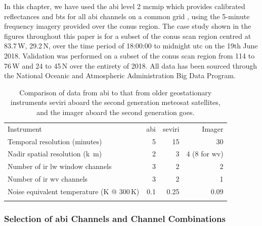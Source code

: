 In this chapter, we have used the \acrshort{abi} level 2 \acrshort{mcmip} which provides calibrated reflectances and \acrshort{bt}s for all \acrshort{abi} channels on a common grid \citep{schmit_chapter_2020}, using the 5-minute frequency imagery provided over the \acrshort{conus} region.
The case study shown in the figures throughout this paper is for a subset of the \acrshort{conus} scan region centred at 83.7\,\textdegree W, 29.2\,\textdegree N, over the time period of 18:00:00 to midnight \acrshort{utc} on the 19th June 2018.
Validation was performed on a subset of the \acrshort{conus} scan region from 114 to 76\,\textdegree W and 24 to 45\,\textdegree N over the entirety of 2018.
All data has been sourced through the National Oceanic and Atmospheric Administration Big Data Program.

\begin{table}[t]
\centering
\begin{tabular}{lrrr}
\tophline
Instrument                                              & \acrshort{abi}   & \acrshort{seviri}    & Imager \\
\middlehline
Temporal resolution (\unit{minutes})                    & 5     & 15        & 30 \\
Nadir spatial resolution (\unit{k m})                   & 2     & 3         & 4 (8 for \acrshort{wv}) \\
Number of \acrshort{ir} \acrshort{lw} window channels                         & 3     & 2         & 2 \\
Number of \acrshort{ir} \acrshort{wv} channels                                & 3     & 2         & 1 \\
Noise equivalent temperature  (\unit{K} @ 300\,\unit{K})  & 0.1   & 0.25      & 0.09 \\
\bottomhline
\end{tabular}
\caption[
Comparison of data from \acrshort{abi} to that from older geostationary instruments
]{
Comparison of data from \acrshort{abi} to that from older geostationary instruments\; \acrshort{seviri} aboard the second generation meteosat satellites, and the imager aboard the second generation \acrshort{goes}.
} %
\label{table:abi_comparison}
\end{table}


\subsubsection{Selection of \acrshort{abi} Channels and Channel Combinations}

